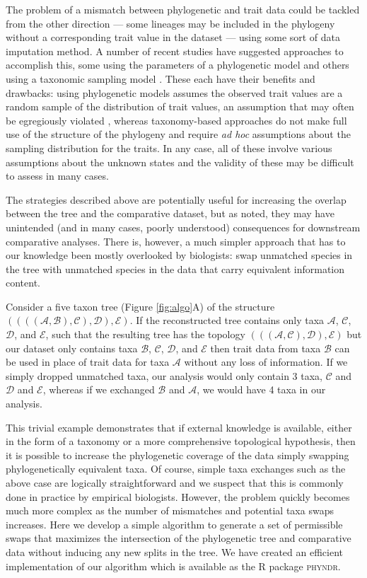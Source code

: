 \documentclass[a4paper,11pt]{article}
\begin{document}
The problem of a mismatch between phylogenetic and trait data could be tackled from the other direction --- some lineages may be included in the phylogeny without a corresponding trait value in the dataset --- using some sort of data imputation method. A number of recent studies have suggested approaches to accomplish this, some using the parameters of a phylogenetic model \citep{Fagan2013, Swenson2014, PEM} and others using a taxonomic sampling model \citep{FitzJohn2014, Sandel2015}. These each have their benefits and drawbacks: using phylogenetic models assumes the observed trait values are a random sample of the distribution of trait values, an assumption that may often be egregiously violated \citep{FitzJohn2014}, whereas taxonomy-based approaches do not make full use of the structure of the phylogeny and require \emph{ad hoc} assumptions about the sampling distribution for the traits. In any case, all of these involve various assumptions about the unknown states and the validity of these may be difficult to assess in many cases.

The strategies described above are potentially useful for increasing the overlap between the tree and the comparative dataset, but as noted, they may have unintended (and in many cases, poorly understood) consequences for downstream comparative analyses. There is, however, a much simpler approach that has to our knowledge been mostly overlooked by biologists: swap unmatched species in the tree with unmatched species in the data that carry equivalent information content. 

Consider a five taxon tree (Figure \ref{fig:algo}A) of the structure $((((\mathcal{A},\mathcal{B}),\mathcal{C}),\mathcal{D}),\mathcal{E})$. If the reconstructed tree contains only taxa $\mathcal{A}$, $\mathcal{C}$, $\mathcal{D}$, and $\mathcal{E}$, such that the resulting tree has the topology $(((\mathcal{A},\mathcal{C}),\mathcal{D}),\mathcal{E})$ but our dataset only contains taxa $\mathcal{B}$, $\mathcal{C}$, $\mathcal{D}$, and $\mathcal{E}$  then trait data from taxa $\mathcal{B}$ can be used in place of trait data for taxa $\mathcal{A}$ without any loss of information. If we simply dropped unmatched taxa, our analysis would only contain 3 taxa, $\mathcal{C}$ and $\mathcal{D}$ and $\mathcal{E}$, whereas if we exchanged $\mathcal{B}$ and $\mathcal{A}$, we would have 4 taxa in our analysis.

This trivial example demonstrates that if external knowledge is available, either in the form of a taxonomy or a more comprehensive topological hypothesis, then it is possible to increase the phylogenetic coverage of the data simply swapping phylogenetically equivalent taxa. Of course, simple taxa exchanges such as the above case are logically straightforward and we suspect that this is commonly done in practice by empirical biologists. However, the problem quickly becomes much more complex as the number of mismatches and potential taxa swaps increases. Here we develop a simple algorithm to generate a set of permissible swaps that maximizes the intersection of the phylogenetic tree and comparative data without inducing any new splits in the tree. We have created an efficient implementation of our algorithm which is available as the R package \textsc{phyndr}. 
\end{document}
